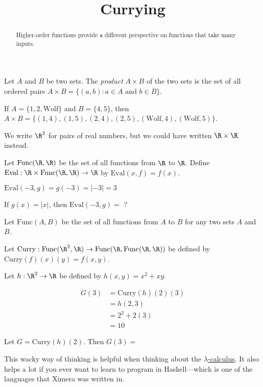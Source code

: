 \documentclass{ximera}
\title{Currying}
\begin{document}
\begin{abstract}
  Higher-order functions provide a different perspective on functions that take many inputs.
\end{abstract}

\begin{definition}
  Let $A$ and $B$ be two sets.  The \textit{product} $A\times B$ of
  the two sets is the set of all ordered pairs $A \times B = \{ (a,b):
  a \in A \text{ and } b \in B\}$.
\end{definition}

\begin{example}
  If $A = \{ 1,2,\text{Wolf}\}$ and $B = \{4,5\}$, then $A \times B =
  \{(1,4),(1,5),(2,4),(2,5),(\text{Wolf},4),(\text{Wolf},5)\}$.
\end{example}

\begin{example}
  We write $\R^2$ for pairs of real numbers, but we could have written
  $\R \times \R$ instead.
\end{example}

\begin{question}
  Let $\text{Func}(\R,\R)$ be the set of all functions from $\R$ to
  $\R$.  Define $\text{Eval}: \R \times \text{Func}(\R,\R) \to \R$ by
  $\text{Eval}(x,f) = f(x)$.
\begin{solution}
\begin{hint}
	$\text{Eval}(-3,g) = g(-3)=|-3|=3$
\end{hint}
If $g(x) = |x|$, then $\text{Eval}(-3,g)=$ ?
\end{solution}
\end{question}

\begin{question}
  Let $\text{Func}(A,B)$ be the set of all functions from $A$ to $B$ for any two sets $A$ and $B$.  
  
  Let $\text{Curry}:\text{Func}(\R^2,\R) \to  \text{Func}(\R,\text{Func}(\R,\R))$ be defined by $\text{Curry}(f)(x)(y) = f(x,y)$.

  Let $h:\R^2 \to \R$ be defined by $h(x,y) = x^2 +xy$.  
  \begin{solution}
    \begin{hint}
      \begin{align*}
        G(3) &= \text{Curry}(h)(2)(3)\\
        &= h(2,3)\\
        &= 2^2+2(3)\\
        &=10
      \end{align*}
    \end{hint}
    Let $G = \text{Curry}(h)(2)$.  Then $G(3) =$ 
  \end{solution}
  
  This wacky way of thinking is helpful when thinking about the
  \href{http://en.wikipedia.org/wiki/Lambda_calculus}{$\lambda$-calculus}.
  It also helps a lot if you ever want to learn to program in
  Haskell---which is one of the languages that Ximera was written in.
  
\end{question}
\end{document}
